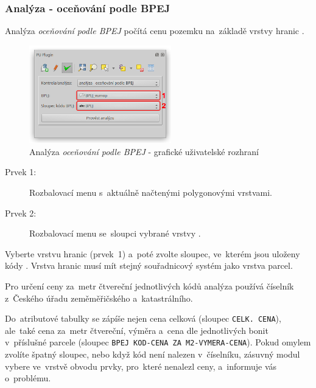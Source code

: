 \subsubsection{Analýza - oceňování podle BPEJ}
\label{manual_analyza_bpej}

Analýza \textit{oceňování podle BPEJ} počítá cenu pozemku na~základě vrstvy hranic .

	\begin{figure}[H]
		\centering
		\includegraphics[width=0.55\textwidth]{./pictures/analyza_bpej.png}
		\caption[Analýza \textit{oceňování podle BPEJ} - grafické uživatelské rozhraní]{Analýza \textit{oceňování podle BPEJ} - grafické uživatelské rozhraní}
		\label{fig:manual_analyza_bpej_gui}
 	\end{figure}

\begin{description}
	\item[Prvek 1:] Rozbalovací menu s~aktuálně načtenými polygonovými vrstvami.
	\item[Prvek 2:] Rozbalovací menu se~sloupci vybrané vrstvy .
\end{description}

Vyberte vrstvu hranic  (prvek~1) a~poté zvolte sloupec, ve~kterém jsou uloženy kódy . Vrstva hranic  musí mít stejný souřadnicový systém jako vrstva parcel.

Pro určení ceny za~metr čtvereční jednotlivých kódů  analýza používá číselník  z~Českého úřadu zeměměřičského a~katastrálního.

Do~atributové tabulky se zápíše nejen cena celková (sloupec \texttt{CELK. CENA}), ale~také cena za~metr čtvereční, výměra a~cena dle jednotlivých bonit v~příslušné parcele (sloupec \texttt{BPEJ KOD-CENA ZA M2-VYMERA-CENA}). Pokud omylem zvolíte špatný sloupec, nebo když kód  není nalezen v~číselníku, zásuvný modul vybere ve~vrstvě obvodu prvky, pro~které nenalezl ceny, a~informuje vás o~problému.
